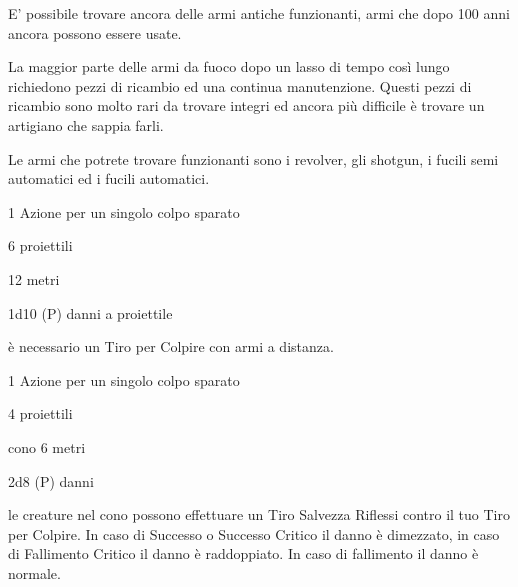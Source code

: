 \begin{multicols}{2}
E' possibile trovare ancora delle armi antiche funzionanti, armi che dopo 100 anni ancora possono essere usate.

La maggior parte delle armi da fuoco dopo un lasso di tempo così lungo richiedono pezzi di ricambio ed una continua manutenzione. Questi pezzi di ricambio sono molto rari da trovare integri ed ancora più difficile è trovare un artigiano che sappia farli.

Le armi che potrete trovare funzionanti sono i revolver, gli shotgun, i fucili semi automatici ed i fucili automatici.

\medskip

\begin{description}[noitemsep, topsep=0pt, parsep=0pt, partopsep=0pt, leftmargin=0cm, labelwidth=2cm]
\item[\textbf{Revolver}]
\item[\textbf{Azioni:}] 1 Azione per un singolo colpo sparato
\item[\textbf{Caricatore:}] 6 proiettili
\item[\textbf{Gittata:}] 12 metri
\item[\textbf{Danno:}] 1d10 (P) danni a proiettile
\item[\textbf{Regole:}] è necessario un Tiro per Colpire con armi a distanza.
\end{description}

\medskip

\begin{description}[noitemsep, topsep=0pt, parsep=0pt, partopsep=0pt, leftmargin=0cm, labelwidth=2cm]
	\item[\textbf{Shotgun}]
	\item[\textbf{Azioni:}] 1 Azione per un singolo colpo sparato
	\item[\textbf{Caricatore:}] 4 proiettili
	\item[\textbf{Gittata:}] cono 6 metri
	\item[\textbf{Danno:}] 2d8 (P) danni
	\item[\textbf{Regole:}] le creature nel cono possono effettuare un Tiro Salvezza Riflessi contro il tuo Tiro per Colpire. In caso di Successo o Successo Critico il danno è dimezzato, in caso di Fallimento Critico il danno è raddoppiato. In caso di fallimento il danno è normale.
\end{description}

\medskip


\end{multicols}
